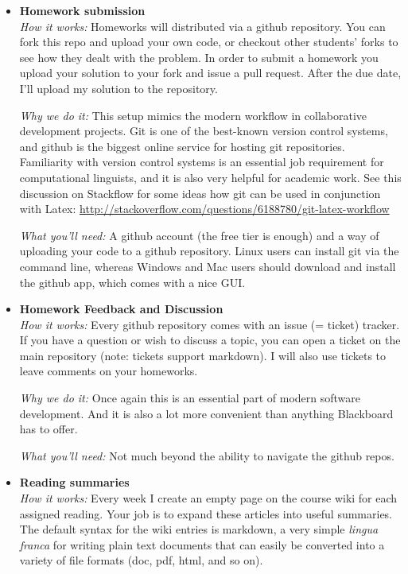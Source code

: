 \begin{itemize}
    \item \textbf{Homework submission}\\
        \emph{How it works:}
        Homeworks will distributed via a github repository. 
        You can fork this repo and upload your own code, or checkout other students' forks to see how they dealt with the problem.
        In order to submit a homework you upload your solution to your fork and issue a pull request.
        After the due date, I'll upload my solution to the repository.

        \emph{Why we do it:}
        This setup mimics the modern workflow in collaborative development projects.
        Git is one of the best-known version control systems, and github is the biggest online service for hosting git repositories.
        Familiarity with version control systems is an essential job requirement for computational linguists, and it is also very helpful for academic work.
        See this discussion on Stackflow for some ideas how git can be used in conjunction with Latex:
        \href{http://stackoverflow.com/questions/6188780/git-latex-workflow}{http://stackoverflow.com/questions/6188780/git-latex-workflow}

        \emph{What you'll need:}
        A github account (the free tier is enough) and a way of uploading your code to a github repository. Linux users can install git via the command line, whereas Windows and Mac users should download and install the github app, which comes with a nice GUI.

    \item \textbf{Homework Feedback and Discussion}\\
        \emph{How it works:}
        Every github repository comes with an issue (= ticket) tracker.
        If you have a question or wish to discuss a topic, you can open a ticket on the main repository (note: tickets support markdown).
        I will also use tickets to leave comments on your homeworks.

        \emph{Why we do it:}
        Once again this is an essential part of modern software development.
        And it is also a lot more convenient than anything Blackboard has to offer.

        \emph{What you'll need:}
        Not much beyond the ability to navigate the github repos.

    \item \textbf{Reading summaries}\\
        \emph{How it works:}
        Every week I create an empty page on the course wiki for each assigned reading.
        Your job is to expand these articles into useful summaries.
        The default syntax for the wiki entries is markdown, a very simple \emph{lingua franca} for writing plain text documents that can easily be converted into a variety of file formats (doc, pdf, html, and so on).


\end{itemize}
